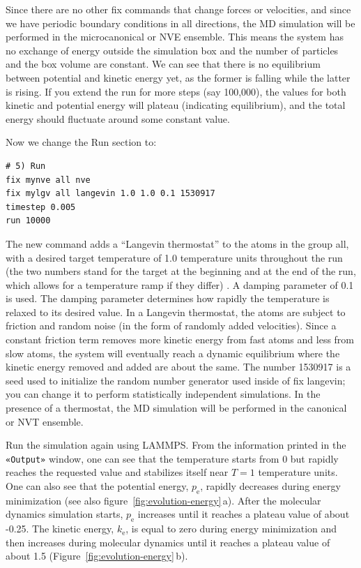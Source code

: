\documentclass[9pt,tutorial]{livecoms}
\newcommand{\lmpcmd}[1]{\hspace{0pt}\colorbox{listing}{\textcolor{command}{\small{#1}}}\hspace{0pt}} %
\newcommand{\guicmd}[1]{\textcolor{command}{\texttt{«#1»}}} %
\begin{document}
Since there are no other fix commands that change forces or velocities,
and since we have periodic boundary conditions in all directions, the MD
simulation will be performed in the microcanonical or NVE ensemble.
This means the system has no exchange of energy outside the simulation
box and the number of particles and the box volume are constant.  We can
see that there is no equilibrium between potential and kinetic energy
yet, as the former is falling while the latter is rising.  If you extend
the run for more steps (say 100,000), the values for both kinetic and
potential energy will plateau (indicating equilibrium), and the total
energy should fluctuate around some constant value.

Now we change the \lmpcmd{Run} section to:
\begin{lstlisting}
# 5) Run
fix mynve all nve
fix mylgv all langevin 1.0 1.0 0.1 1530917
timestep 0.005
run 10000
\end{lstlisting}

The new command adds a ``Langevin thermostat'' to the atoms in the group
\lmpcmd{all}, with a desired target temperature of 1.0 temperature units
throughout the run (the two numbers stand for the target at the beginning
and at the end of the run, which allows for a temperature ramp if
they differ) \cite{schneider1978molecular}.  A \lmpcmd{damping}
parameter of 0.1 is used.  The \lmpcmd{damping} parameter determines how
rapidly the temperature is relaxed to its desired value.  In a Langevin
thermostat, the atoms are subject to friction and random noise (in the form
of randomly added velocities).  Since a constant friction term removes
more kinetic energy from fast atoms and less from slow atoms, the system
will eventually reach a dynamic equilibrium where the kinetic energy
removed and added are about the same.  The number 1530917 is a
seed used to initialize the random number generator used inside of
\lmpcmd{fix langevin}; you can change it to perform statistically
independent simulations.  In the presence of a thermostat, the MD simulation
will be performed in the canonical or NVT ensemble.

Run the simulation again using LAMMPS. From the information
printed in the \guicmd{Output} window, one can see that the temperature
starts from 0 but rapidly reaches the requested value and
stabilizes itself near $T=1$ temperature units.  One can also see that
the potential energy, $p_\text{e}$, rapidly decreases during energy
minimization (see also figure~\ref{fig:evolution-energy}\,a).  After
the molecular dynamics simulation starts, $p_\text{e}$ increases until
it reaches a plateau value of about -0.25.  The kinetic energy,
$k_\text{e}$, is equal to zero during energy minimization and then
increases during molecular dynamics until it reaches a plateau value of
about 1.5 (Figure~\ref{fig:evolution-energy}\,b).
\end{document}
